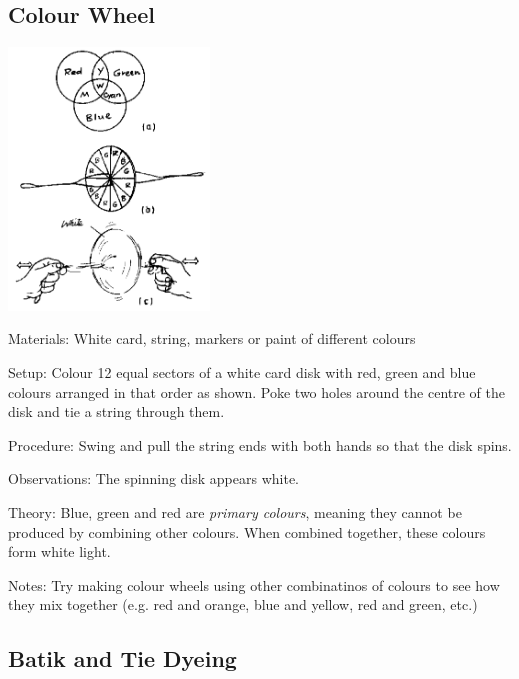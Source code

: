 \begin{multicols}{2}
\subsection{Colour Wheel}

\begin{center}
\includegraphics[width=0.4\textwidth]{./img/source/colour-wheel.png}
\end{center}

\begin{description*}
\item[Materials:]{White card, string, markers or paint of different colours}
\item[Setup:]{Colour 12 equal sectors of a white card disk with red, green and blue colours arranged in that order as shown. Poke two holes around the centre of the disk and tie a string through them.}
\item[Procedure:]{Swing and pull the string ends with both hands so that the disk spins.}
\item[Observations:]{The spinning disk appears white.}
\item[Theory:]{Blue, green and red are \emph{primary colours}, meaning they cannot be produced by combining other colours. When combined together, these colours form white light.}
\item[Notes:]{Try making colour wheels using other combinatinos of colours to see how they mix together (e.g. red and orange, blue and yellow, red and green, etc.)}
\end{description*}

\subsection{Batik and Tie Dyeing}


\end{multicols}
